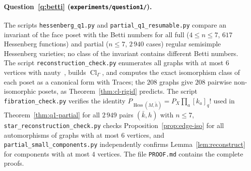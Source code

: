\documentclass[11pt,a4paper]{article}
\numberwithin{equation}{section}
\theoremstyle{plain}
\theoremstyle{definition}
\theoremstyle{remark}
\DeclareMathOperator{\Hess}{Hess}
\DeclareMathOperator{\Cl}{Cl}
\begin{document}
\paragraph{Question~\ref{q:betti} (\nolinkurl{experiments/question1/}).}
The scripts \texttt{hessenberg\_q1.py} and \texttt{partial\_q1\_resumable.py} compare an invariant of the face poset with the Betti numbers for all full ($4\leqslant n\leqslant7$, $617$ Hessenberg functions) and partial ($n\leqslant7$, $2\,940$ cases) regular semisimple Hessenberg varieties; no class of the invariant contains different Betti numbers. The script \texttt{reconstruction\_check.py} enumerates all graphs with at most $6$ vertices with nauty~\cite{MP14}, builds $\Cl_\Gamma$, and computes the exact isomorphism class of each poset as a canonical form with Traces; the $208$ graphs give $208$ pairwise non-isomorphic posets, as Theorem~\ref{thm:cl-rigid} predicts. The script \texttt{fibration\_check.py} verifies the identity $P_{\Hess(M,\tilde h)}=P_X\prod_a[k_a]_q!$ used in Theorem~\ref{thm:q1-partial} for all $2\,949$ pairs $(\bar k,h)$ with $n\leqslant7$, \texttt{star\_reconstruction\_check.py} checks Proposition~\ref{prop:edge-iso} for all automorphisms of graphs with at most $6$ vertices, and \texttt{partial\_small\_components.py} independently confirms Lemma~\ref{lem:reconstruct} for components with at most $4$ vertices. The file \texttt{PROOF.md} contains the complete proofs.
\end{document}
